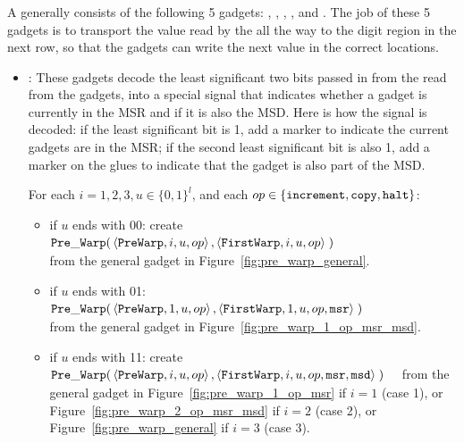 \subsubsection{\warpunit}

%
A {\warpunit} generally consists of the following 5 gadgets: \prewarp, \firstwarp, \warpbridge, \secondwarp, and \postwarp.
%
The job of these 5 gadgets is to transport the value read by the {\cread} all the way to the digit region in the next row, so that the {\cwrite} gadgets can write the next value in the correct locations.
%


\begin{itemize}

    \item {\prewarp}:
    These gadgets decode the least significant two bits passed in from the read from the {\cread} gadgets, into a special signal that indicates whether a gadget is currently in the MSR and if it is also the MSD.
    Here is how the signal is decoded: if the least significant bit is 1, add a marker to indicate the current gadgets are in the MSR; if the second least significant bit is also 1, add a marker on the glues to indicate that the gadget is also part of the MSD.

    For each $i = 1,2,3, u \in \{0, 1\}^l$, and each $op \in \{ {\tt increment}, {\tt copy}, {\tt halt} \}$:
    \begin{itemize}
        \item if $u$ ends with 00:
        create
        $\begin{aligned}[t]
            {\tt Pre\_Warp}(& \left\langle {\tt PreWarp},   i, u, op \right\rangle,
                       \left\langle {\tt FirstWarp}, i, u, op \right\rangle \;)
        \end{aligned}$ \\ from the general gadget in Figure~\ref{fig:pre_warp_general}.

        \item if $u$ ends with 01:
        $\begin{aligned}[t]
            {\tt Pre\_Warp}(& \left\langle {\tt PreWarp},   1, u, op            \right\rangle,
                       \left\langle {\tt FirstWarp}, 1, u, op, {\tt msr} \right\rangle \;)
        \end{aligned}$ \\ from the general gadget in Figure~\ref{fig:pre_warp_1_op_msr_msd}.

        \item if $u$ ends with 11:
        create
        $\begin{aligned}[t]
            {\tt Pre\_Warp}(& \left\langle {\tt PreWarp},   i, u, op                       \right\rangle,
                       \left\langle {\tt FirstWarp}, i, u, op, {\tt msr}, {\tt msd} \right\rangle \;)
        \end{aligned}$ from the general gadget in Figure~\ref{fig:pre_warp_1_op_msr} if $i = 1$ (case 1),
        or Figure~\ref{fig:pre_warp_2_op_msr_msd} if $i = 2$ (case 2), or Figure~\ref{fig:pre_warp_general} if $i = 3$ (case 3).
    \end{itemize}
    \vspace{.5cm}


\end{itemize}

